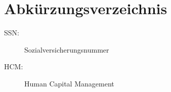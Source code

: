 
\section *{Abkürzungsverzeichnis} %
\begin{description}
\item[SSN:] Sozialversicherungsnummer
\item[HCM:] Human Capital Management
\end{description}
